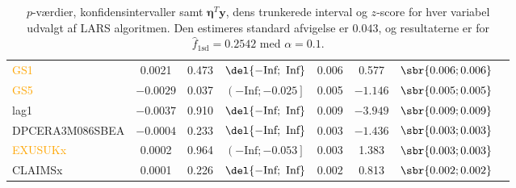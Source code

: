 \begin{table}[ht]
{\begin{tabular}{lccccccc}
\textcolor{orange}{GS1} &0.0021 &0.473  &    $\del{-\text{Inf}   ;  \text{ Inf} }$ &   0.006&   0.577   &$\sbr{0.006 ;0.006}$ \\  
\textcolor{orange}{GS5} &$-0.0029$&0.037 &     $\left( -\text{Inf}   ;  -0.025\right]   $& 0.005 & $-1.146 $ & $\sbr{0.005 ;0.005 }$\\  
 \textcolor{blue3}{lag1} &$-0.0037$ & 0.910   & $\del{-\text{Inf}   ;  \text{ Inf} }$  & 0.009  &$-3.949$  &$\sbr{0.009; 0.009 }$ \\ 
 \textcolor{red3}{DPCERA3M086SBEA} &$-0.0004$& 0.233  &   $\del{-\text{Inf}   ;  \text{ Inf} }$ & 0.003 & $-1.436$&  $\sbr{0.003; 0.003}$ \\ 
\textcolor{orange}{ EXUSUKx} &0.0002  & 0.964   &   $\left( -\text{Inf}     ;-0.053 \right] $&  0.003   &1.383&  $\sbr{0.003; 0.003 }$   \\   
 \textcolor{blue3}{CLAIMSx} &0.0001& 0.226 &    $\del{-\text{Inf}   ;  \text{ Inf} }$&0.002 &  0.813  & $\sbr{0.002 ;0.002 }$   \\ 
\bottomrule
\end{tabular}  
}
\caption{\(p\)-værdier, konfidensintervaller samt  $\boldsymbol{\eta}^T\textbf{y}$, dens trunkerede interval og $z$-score for hver variabel udvalgt af LARS algoritmen. Den estimeres standard afvigelse er \(0.043\), og resultaterne er for \(\widehat{f}_{1 \text{sd}} = 0.2542\) med \(\alpha = 0.1\).} \label{tab:larInf_kryds}
\end{table} 
